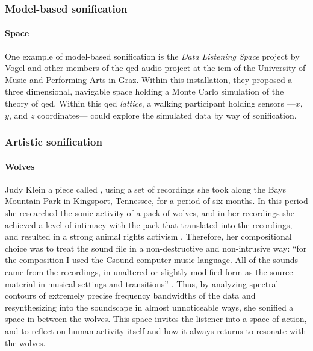 \subsubsection{Model-based sonification}
\label{sonification:model}

\paragraph{Space}
One example of model-based sonification is the \textit{Data Listening Space} project by Vogel and other members of the \gls{qcd-audio} project \parencite{icmc/bbp2372.2012.096} at the \gls{iem} of the University of Music and Performing Arts in Graz. Within this installation, they proposed a three dimensional, navigable space holding a Monte Carlo simulation of the theory of \gls{qed}. Within this \gls{qed} \textit{lattice}, a walking participant holding sensors ---$x$, $y$, and $z$ coordinates--- could explore the simulated data by way of sonification.

\subsubsection{Artistic sonification}
\label{sonification:artistic}

\paragraph{Wolves}
Judy Klein \parencite{Kle98:The} a piece called  , using a set of recordings she took along the Bays Mountain Park in Kingsport, Tennessee, for a period of six months. In this period she researched the sonic activity of a pack of wolves, and in her recordings she achieved a level of intimacy with the pack that translated into the recordings, and resulted in a strong animal rights activism \parencite{Kle17:Lec}. Therefore, her compositional choice was to treat the sound file in a non-destructive and non-intrusive way: ``for the composition I used the Csound computer music language. All of the sounds came from the recordings, in unaltered or slightly modified form as the source material in musical settings and transitions'' \parencite{Kle98:The}. Thus, by analyzing spectral contours of extremely precise frequency bandwidths of the data and resynthesizing into the soundscape in almost unnoticeable ways, she sonified a space in between the wolves. This space invites the listener into a space of action, and to reflect on human activity itself and how it always returns to resonate with the wolves.

